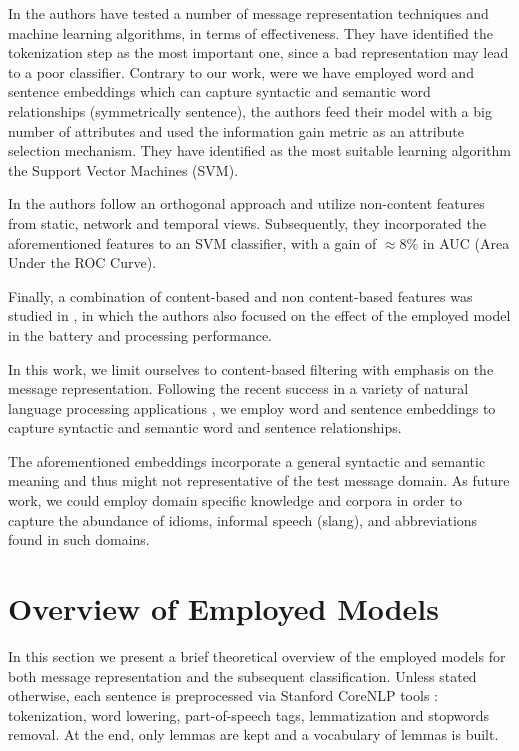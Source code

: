 \documentclass[letterpaper]{article}
\begin{document}
In \cite{gomez2006content} the authors have tested a number of message representation techniques and machine learning algorithms, in terms of effectiveness. They have identified the tokenization step as the most important one, since a bad representation may lead to a poor classifier. Contrary to our work, were we have employed word and sentence embeddings which can capture syntactic and semantic word relationships (symmetrically sentence), the authors feed their model with a big number of attributes and used the information gain metric \cite{yang1999evaluation} as an attribute selection mechanism. They have identified as the most suitable learning algorithm the Support Vector Machines (SVM).

In \cite{6133257} the authors follow an orthogonal approach and utilize non-content features from static, network and temporal views. Subsequently, they incorporated the aforementioned features to an SVM classifier, with a gain of $\approx 8\%$ in AUC (Area Under the ROC Curve).

Finally, a combination of content-based and non content-based features was studied in \cite{sulaiman2016new}, in which the authors also focused on the effect of the employed model in the battery and processing performance.

In this work, we limit ourselves to content-based filtering with emphasis on the message representation. Following the recent success in a variety of natural language processing applications \cite{mikolov2013distributed} \cite{bojanowski2016enriching} \cite{pagliardini2017unsupervised}, we employ word and sentence embeddings to capture syntactic and semantic word and sentence relationships.

The aforementioned embeddings incorporate a general syntactic and semantic meaning and thus might not representative of the test message domain. As future work, we could employ domain specific knowledge and corpora in order to capture the abundance of idioms, informal speech (slang), and abbreviations found in such domains.

\section{Overview of Employed Models} \label{Overview}

In this section we present a brief theoretical overview of the employed models for both message representation and the subsequent classification. Unless stated otherwise, each sentence is preprocessed via Stanford CoreNLP tools \cite{manning-EtAl2014}: tokenization, word lowering, part-of-speech tags, lemmatization and stopwords removal. At the end, only lemmas are kept and a vocabulary of lemmas is built.
\end{document}
